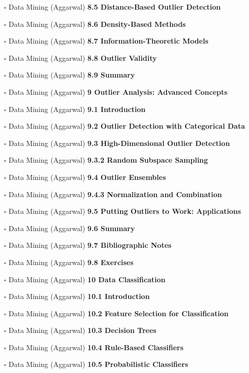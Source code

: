 \documentclass[a4, landscape, 12pt]{article}
\newcommand{\checkbox}{$\square$}%
\begin{document}
\begin{itemize}
{}
\item [\checkbox]  Data Mining (Aggarwal) \textbf{ 8.5 Distance-Based Outlier Detection
}
\item [\checkbox]  Data Mining (Aggarwal) \textbf{ 8.6 Density-Based Methods
}
\item [\checkbox]  Data Mining (Aggarwal) \textbf{ 8.7 Information-Theoretic Models
}
\item [\checkbox]  Data Mining (Aggarwal) \textbf{ 8.8 Outlier Validity
}
\item [\checkbox]  Data Mining (Aggarwal) \textbf{ 8.9 Summary
}
\item [\checkbox]  Data Mining (Aggarwal) \textbf{ 9 Outlier Analysis: Advanced Concepts
}
\item [\checkbox]  Data Mining (Aggarwal) \textbf{ 9.1 Introduction
}
\item [\checkbox]  Data Mining (Aggarwal) \textbf{ 9.2 Outlier Detection with Categorical Data
}
\item [\checkbox]  Data Mining (Aggarwal) \textbf{ 9.3 High-Dimensional Outlier Detection
}
\item [\checkbox]  Data Mining (Aggarwal) \textbf{ 9.3.2 Random Subspace Sampling
}
\item [\checkbox]  Data Mining (Aggarwal) \textbf{ 9.4 Outlier Ensembles
}
\item [\checkbox]  Data Mining (Aggarwal) \textbf{ 9.4.3 Normalization and Combination
}
\item [\checkbox]  Data Mining (Aggarwal) \textbf{ 9.5 Putting Outliers to Work: Applications
}
\item [\checkbox]  Data Mining (Aggarwal) \textbf{ 9.6 Summary
}
\item [\checkbox]  Data Mining (Aggarwal) \textbf{ 9.7 Bibliographic Notes
}
\item [\checkbox]  Data Mining (Aggarwal) \textbf{ 9.8 Exercises
}
\item [\checkbox]  Data Mining (Aggarwal) \textbf{ 10 Data Classification
}
\item [\checkbox]  Data Mining (Aggarwal) \textbf{ 10.1 Introduction
}
\item [\checkbox]  Data Mining (Aggarwal) \textbf{ 10.2 Feature Selection for Classification
}
\item [\checkbox]  Data Mining (Aggarwal) \textbf{ 10.3 Decision Trees
}
\item [\checkbox]  Data Mining (Aggarwal) \textbf{ 10.4 Rule-Based Classifiers
}
\item [\checkbox]  Data Mining (Aggarwal) \textbf{ 10.5 Probabilistic Classifiers
}
\end{itemize}
\end{document}
